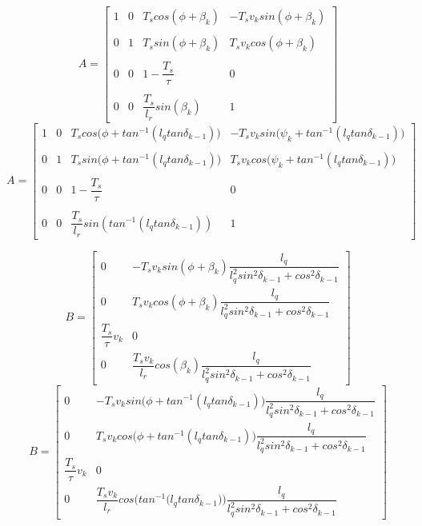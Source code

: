 \begin{equation}
 A =
  \begin{bmatrix}
    1 & 0 & T_s cos(\phi + \beta_k) & -T_s v_k sin(\phi + \beta_k) \\\\
    0 & 1 & T_s sin(\phi + \beta_k) & T_s v_k cos(\phi + \beta_k) \\\\
    0 & 0 & 1-\dfrac{T_s}{\tau} & 0 \\\\
    0 & 0 & \dfrac{T_s}{l_r}sin(\beta_k) & 1
  \end{bmatrix}
\end{equation}
\begin{equation}
  A =
  \begin{bmatrix}
    1 & 0 & T_s cos\Big(\phi + tan^{-1} (l_q tan\delta_{k-1})\Big) & -T_s v_k sin\Big(\psi_k + tan^{-1} (l_q tan\delta_{k-1})\Big) \\\\
    0 & 1 & T_s sin\Big(\phi + tan^{-1} (l_q tan\delta_{k-1})\Big) & T_s v_k cos\Big(\psi_k + tan^{-1} (l_q tan\delta_{k-1})\Big) \\\\
    0 & 0 & 1-\dfrac{T_s}{\tau} & 0 \\\\
    0 & 0 & \dfrac{T_s}{l_r}sin(tan^{-1} (l_q tan\delta_{k-1})) & 1
  \end{bmatrix}
\end{equation}


\begin{equation}
 B =
  \begin{bmatrix}
    0 & -T_s v_k sin(\phi + \beta_k) \dfrac{l_q}{l_q^2 sin^2\delta_{k-1} + cos^2\delta_{k-1}} \\
    0 & T_s v_k cos(\phi + \beta_k) \dfrac{l_q}{l_q^2 sin^2\delta_{k-1} + cos^2\delta_{k-1}} \\
    \dfrac{T_s}{\tau} v_k & 0 \\
    0 & \dfrac{T_s v_k}{l_r} cos(\beta_k) \dfrac{l_q}{l_q^2 sin^2\delta_{k-1} + cos^2\delta_{k-1}}
  \end{bmatrix}
\end{equation}
\begin{equation}
  B =
  \begin{bmatrix}
    0 & -T_s v_k sin\Big(\phi + tan^{-1} (l_q tan\delta_{k-1})\Big) \dfrac{l_q}{l_q^2 sin^2\delta_{k-1} + cos^2\delta_{k-1}} \\
    0 & T_s v_k cos\Big(\phi + tan^{-1} (l_q tan\delta_{k-1})\Big) \dfrac{l_q}{l_q^2 sin^2\delta_{k-1} + cos^2\delta_{k-1}} \\
    \dfrac{T_s}{\tau} v_k & 0 \\
    0 & \dfrac{T_s v_k}{l_r} cos\Bigg(tan^{-1} \Big(l_q tan\delta_{k-1}\Big)\Bigg) \dfrac{l_q}{l_q^2 sin^2\delta_{k-1} + cos^2\delta_{k-1}}
  \end{bmatrix}
\end{equation}


